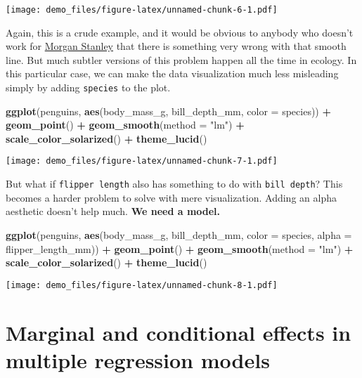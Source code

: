 \documentclass[
]{article}
\newenvironment{Shaded}{\begin{snugshade}}{\end{snugshade}}
\newcommand{\AttributeTok}[1]{\textcolor[rgb]{0.13,0.29,0.53}{#1}}
\newcommand{\FunctionTok}[1]{\textcolor[rgb]{0.13,0.29,0.53}{\textbf{#1}}}
\newcommand{\NormalTok}[1]{#1}
\newcommand{\SpecialCharTok}[1]{\textcolor[rgb]{0.81,0.36,0.00}{\textbf{#1}}}
\newcommand{\StringTok}[1]{\textcolor[rgb]{0.31,0.60,0.02}{#1}}
\begin{document}
\texttt{[image: demo\_files/figure-latex/unnamed-chunk-6-1.pdf]}

Again, this is a crude example, and it would be obvious to anybody who
doesn't work for
\href{https://www.tjmahr.com/morgan-stanley-cursed-covid-plot/}{Morgan
Stanley} that there is something very wrong with that smooth line. But
much subtler versions of this problem happen all the time in ecology. In
this particular case, we can make the data visualization much less
misleading simply by adding \texttt{species} to the plot.

\begin{Shaded}
\begin{Highlighting}[]
\FunctionTok{ggplot}\NormalTok{(penguins, }\FunctionTok{aes}\NormalTok{(body\_mass\_g, bill\_depth\_mm, }\AttributeTok{color =}\NormalTok{ species)) }\SpecialCharTok{+}
  \FunctionTok{geom\_point}\NormalTok{() }\SpecialCharTok{+}
  \FunctionTok{geom\_smooth}\NormalTok{(}\AttributeTok{method =} \StringTok{"lm"}\NormalTok{) }\SpecialCharTok{+}
  \FunctionTok{scale\_color\_solarized}\NormalTok{() }\SpecialCharTok{+}
  \FunctionTok{theme\_lucid}\NormalTok{()}
\end{Highlighting}
\end{Shaded}

\texttt{[image: demo\_files/figure-latex/unnamed-chunk-7-1.pdf]}

But what if \texttt{flipper\ length} also has something to do with
\texttt{bill\ depth}? This becomes a harder problem to solve with mere
visualization. Adding an alpha aesthetic doesn't help much. \textbf{We
need a model.}

\begin{Shaded}
\begin{Highlighting}[]
\FunctionTok{ggplot}\NormalTok{(penguins, }\FunctionTok{aes}\NormalTok{(body\_mass\_g, bill\_depth\_mm, }\AttributeTok{color =}\NormalTok{ species, }\AttributeTok{alpha =}\NormalTok{ flipper\_length\_mm)) }\SpecialCharTok{+}
  \FunctionTok{geom\_point}\NormalTok{() }\SpecialCharTok{+}
  \FunctionTok{geom\_smooth}\NormalTok{(}\AttributeTok{method =} \StringTok{"lm"}\NormalTok{) }\SpecialCharTok{+}
  \FunctionTok{scale\_color\_solarized}\NormalTok{() }\SpecialCharTok{+}
  \FunctionTok{theme\_lucid}\NormalTok{()}
\end{Highlighting}
\end{Shaded}

\texttt{[image: demo\_files/figure-latex/unnamed-chunk-8-1.pdf]}

\hypertarget{marginal-and-conditional-effects-in-multiple-regression-models}{%
\section{Marginal and conditional effects in multiple regression
models}\label{marginal-and-conditional-effects-in-multiple-regression-models}}
\end{document}
